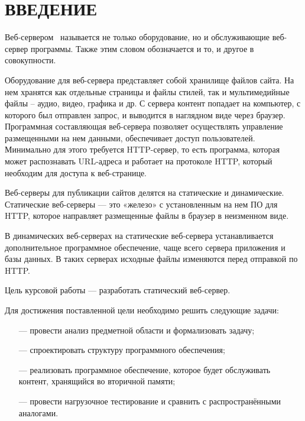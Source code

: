 \chapter*{ВВЕДЕНИЕ}

Веб-сервером~\cite{web-server} называется не только оборудование, но и обслуживающие веб-сервер программы. Также этим словом обозначается и то, и другое в совокупности.

Оборудование для веб-сервера представляет собой хранилище файлов сайта. На нем хранятся как отдельные страницы и файлы стилей, так и мультимедийные файлы – аудио, видео, графика и др. С сервера контент попадает на компьютер, с которого был отправлен запрос, и выводится в наглядном виде через браузер.
Программная составляющая веб-сервера позволяет осуществлять управление размещенными на нем данными, обеспечивает доступ пользователей. Минимально для этого требуется HTTP-сервер, то есть программа, которая может распознавать URL-адреса и работает на протоколе HTTP, который необходим для доступа к веб-странице.

Веб-серверы для публикации сайтов делятся на статические и динамические. Статические веб-серверы --- это «железо» с установленным на нем ПО для HTTP, которое направляет размещенные файлы в браузер в неизменном виде.

В динамических веб-серверах на статические веб-сервера устанавливается дополнительное программное обеспечение, чаще всего сервера приложения и базы данных. В таких серверах исходные файлы изменяются перед отправкой по HTTP.

Цель курсовой работы --- разработать статический веб-сервер. 

Для достижения поставленной цели необходимо решить следующие задачи:

\begin{itemize}
	\item[---] провести анализ предметной области и формализовать задачу;
	\item[---] спроектировать структуру программного обеспечения;
	\item[---] реализовать программное обеспечение, которое будет обслуживать контент, хранящийся во вторичной памяти;
	\item[---] провести нагрузочное тестирование и сравнить с распространёнными
	аналогами.
\end{itemize}

